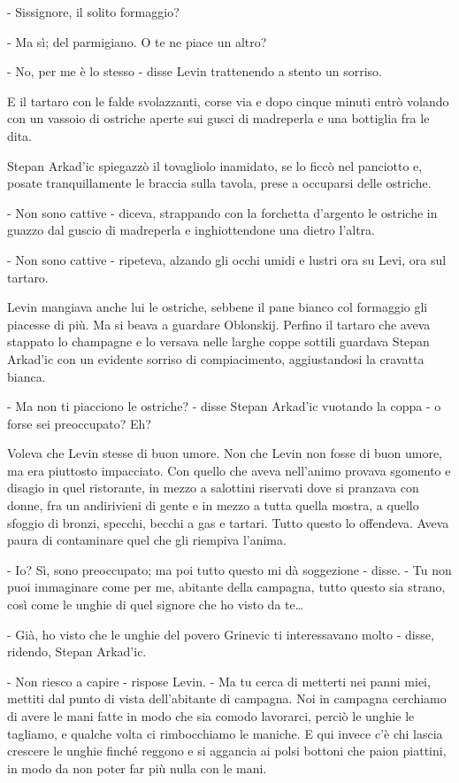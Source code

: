 - Sissignore, il solito formaggio? 

- Ma sì; del parmigiano. O te ne piace un altro? 

- No, per me è lo stesso - disse Levin trattenendo a stento un sorriso. 

E il tartaro con le falde svolazzanti, corse via e dopo cinque minuti entrò volando con un vassoio di ostriche aperte sui gusci di madreperla e una bottiglia fra le dita. 

Stepan Arkad'ic spiegazzò il tovagliolo inamidato, se lo ficcò nel panciotto e, posate tranquillamente le braccia sulla tavola, prese a occuparsi delle ostriche. 

- Non sono cattive - diceva, strappando con la forchetta d'argento le ostriche in guazzo dal guscio di madreperla e inghiottendone una dietro l'altra. 

- Non sono cattive - ripeteva, alzando gli occhi umidi e lustri ora su Levi, ora sul tartaro. 

Levin mangiava anche lui le ostriche, sebbene il pane bianco col formaggio gli piacesse di più. Ma si beava a guardare Oblonskij. Perfino il tartaro che aveva stappato lo champagne e lo versava nelle larghe coppe sottili guardava Stepan Arkad'ic con un evidente sorriso di compiacimento, aggiustandosi la cravatta bianca. 

- Ma non ti piacciono le ostriche? - disse Stepan Arkad'ic vuotando la coppa - o forse sei preoccupato? Eh? 

Voleva che Levin stesse di buon umore. Non che Levin non fosse di buon umore, ma era piuttosto impacciato. Con quello che aveva nell'animo provava sgomento e disagio in quel ristorante, in mezzo a salottini riservati dove si pranzava con donne, fra un andirivieni di gente e in mezzo a tutta quella mostra, a quello sfoggio di bronzi, specchi, becchi a gas e tartari. Tutto questo lo offendeva. Aveva paura di contaminare quel che gli riempiva l'anima. 

- Io? Sì, sono preoccupato; ma poi tutto questo mi dà soggezione - disse. - Tu non puoi immaginare come per me, abitante della campagna, tutto questo sia strano, così come le unghie di quel signore che ho visto da te\ldots{} 

- Già, ho visto che le unghie del povero Grinevic ti interessavano molto - disse, ridendo, Stepan Arkad'ic. 

- Non riesco a capire - rispose Levin. - Ma tu cerca di metterti nei panni miei, mettiti dal punto di vista dell'abitante di campagna. Noi in campagna cerchiamo di avere le mani fatte in modo che sia comodo lavorarci, perciò le unghie le tagliamo, e qualche volta ci rimbocchiamo le maniche. E qui invece c'è chi lascia crescere le unghie finché reggono e si aggancia ai polsi bottoni che paion piattini, in modo da non poter far più nulla con le mani. 

